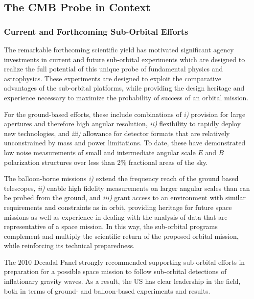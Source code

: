
\subsection{The CMB Probe in Context}
\label{sec:spacemission}

\vspace{-0.05in}

\subsubsection{Current and Forthcoming Sub-Orbital Efforts}

The remarkable forthcoming scientific yield has motivated significant agency investments 
in current and future sub-orbital experiments which are designed to realize the full potential of this
unique probe of fundamental physics and astrophysics.    These experiments are designed 
to exploit the comparative advantages of the sub-orbital platforms, while providing the design heritage and 
experience necessary to maximize the probability of success of an orbital mission. 

For the ground-based efforts, these include combinations of {\it i)}
provision for large apertures and therefore high angular
resolution, {\it ii)} flexibility to rapidly deploy new technologies, and {\it iii)}
allowance for detector formats that are relatively unconstrained by
mass and power limitations.  To date, these have demonstrated low
noise measurements of small and intermediate angular scale $E$ and $B$ polarization 
structures over less than 2\% fractional areas of the sky. 


The balloon-borne missions {\it i)} extend the frequency reach of the ground based telescopes, 
{\it ii)} enable high fidelity measurements on larger angular scales than can be probed from the 
ground, and {\it iii)} grant access to an environment with similar requirements and constraints
as in orbit, providing heritage for future space missions as well as experience in dealing with the 
analysis of data that are representative of a space mission. In this way, the sub-orbital programs 
complement and multiply the scientific return of the proposed orbital mission, while reinforcing its 
technical preparedness.  

The 2010 Decadal Panel strongly recommended supporting sub-orbital efforts in preparation 
for a possible space mission to follow sub-orbital detections of inflationary gravity waves. 
As a result, the US has clear leadership in the field, both in terms of ground- and balloon-based 
experiments and results. 


